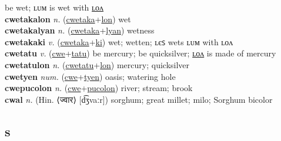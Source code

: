 be wet; ʟᴜᴍ is wet with \hyperref[cwetakalon]{ʟᴏᴧ} \label{cwetaka} \\
\textbf{cwetakalon} \textit{n.} (\hyperref[cwetaka]{cwetaka}+\hyperref[lon]{lon})
wet \label{cwetakalon} \\
\textbf{cwetakalyan} \textit{n.} (\hyperref[cwetaka]{cwetaka}+\hyperref[lyan]{lyan})
wetness \label{cwetakalyan} \\
\textbf{cwetakaki} \textit{v.} (\hyperref[cwetaka]{cwetaka}+\hyperref[ki]{ki})
wet; wetten; ʟєꜱ wets ʟᴜᴍ with ʟᴏᴧ \label{cwetakaki} \\
\textbf{cwetatu} \textit{v.} (\hyperref[cwe]{cwe}+\hyperref[tatu]{tatu})
be mercury; be quicksilver; \hyperref[cwetatulon]{ʟᴏᴧ} is made of mercury \label{cwetatu} \\
\textbf{cwetatulon} \textit{n.} (\hyperref[cwetatu]{cwetatu}+\hyperref[lon]{lon})
mercury; quicksilver \label{cwetatulon} \\
\textbf{cwetyen} \textit{num.} (\hyperref[cwe]{cwe}+\hyperref[tyen]{tyen})
oasis; watering hole \label{cwetyen} \\
\textbf{cwepucolon} \textit{n.} (\hyperref[cwe]{cwe}+\hyperref[pucolon]{pucolon})
river; stream; brook \label{cwepucolon} \\
\textbf{cwal} \textit{n.} (Hin. ⟨ज्वार⟩ [d͡ʒvaːr])
sorghum; great millet; milo; Sorghum bicolor \label{cwal} \\
\subsection{s}

